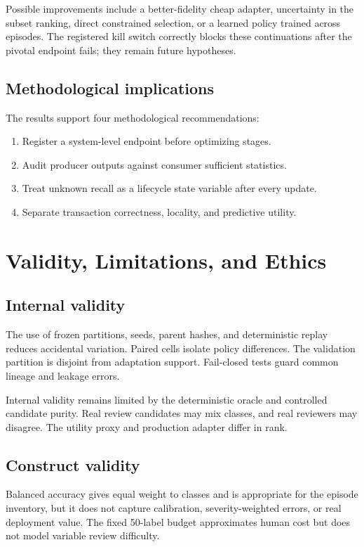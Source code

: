 \documentclass[12pt,oneside]{report}
\begin{document}
Possible improvements include a better-fidelity cheap adapter, uncertainty in
the subset ranking, direct constrained selection, or a learned policy trained
across episodes. The registered kill switch correctly blocks these
continuations after the pivotal endpoint fails; they remain future hypotheses.

\section{Methodological implications}

The results support four methodological recommendations:

\begin{enumerate}
\item Register a system-level endpoint before optimizing stages.
\item Audit producer outputs against consumer sufficient statistics.
\item Treat unknown recall as a lifecycle state variable after every update.
\item Separate transaction correctness, locality, and predictive utility.
\end{enumerate}

\chapter{Validity, Limitations, and Ethics}

\section{Internal validity}

The use of frozen partitions, seeds, parent hashes, and deterministic replay
reduces accidental variation. Paired cells isolate policy differences. The
validation partition is disjoint from adaptation support. Fail-closed tests
guard common lineage and leakage errors.

Internal validity remains limited by the deterministic oracle and controlled
candidate purity. Real review candidates may mix classes, and real reviewers
may disagree. The utility proxy and production adapter differ in rank.

\section{Construct validity}

Balanced accuracy gives equal weight to classes and is appropriate for the
episode inventory, but it does not capture calibration, severity-weighted
errors, or real deployment value. The fixed 50-label budget approximates human
cost but does not model variable review difficulty.
\end{document}

